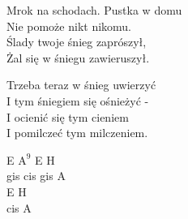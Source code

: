 \begin{text}
    Mrok na schodach. Pustka w domu\\
    Nie pomoże nikt nikomu.\\
    Ślady twoje śnieg zaprószył,\\
    Żal się w śniegu zawieruszył.

    Trzeba teraz w śnieg uwierzyć\\
    I tym śniegiem się ośnieżyć -\\
    I ocienić się tym cieniem\\
    I pomilczeć tym milczeniem.
\end{text}
\begin{chord}
    E $\mathrm{A^{9}}$ E H\\
    gis cis gis A\\
    E H\\
    cis A
\end{chord}
